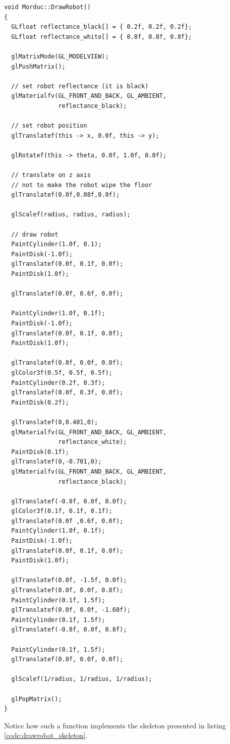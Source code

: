 \begin{lstlisting}[caption={\texttt{Morduc::DrawRobot()} function}, label={code:drawrobot}, frame=trBL]
void Morduc::DrawRobot()
{
  GLfloat reflectance_black[] = { 0.2f, 0.2f, 0.2f};
  GLfloat reflectance_white[] = { 0.8f, 0.8f, 0.8f};
  
  glMatrixMode(GL_MODELVIEW);  
  glPushMatrix();

  // set robot reflectance (it is black)
  glMaterialfv(GL_FRONT_AND_BACK, GL_AMBIENT, 
               reflectance_black);

  // set robot position
  glTranslatef(this -> x, 0.0f, this -> y);

  glRotatef(this -> theta, 0.0f, 1.0f, 0.0f);
  
  // translate on z axis
  // not to make the robot wipe the floor
  glTranslatef(0.0f,0.08f,0.0f);

  glScalef(radius, radius, radius);
  
  // draw robot
  PaintCylinder(1.0f, 0.1);
  PaintDisk(-1.0f);
  glTranslatef(0.0f, 0.1f, 0.0f);
  PaintDisk(1.0f);
  
  glTranslatef(0.0f, 0.6f, 0.0f);

  PaintCylinder(1.0f, 0.1f);
  PaintDisk(-1.0f);
  glTranslatef(0.0f, 0.1f, 0.0f);
  PaintDisk(1.0f);

  glTranslatef(0.8f, 0.0f, 0.0f);
  glColor3f(0.5f, 0.5f, 0.5f);
  PaintCylinder(0.2f, 0.3f);
  glTranslatef(0.0f, 0.3f, 0.0f);
  PaintDisk(0.2f);

  glTranslatef(0,0.401,0);
  glMaterialfv(GL_FRONT_AND_BACK, GL_AMBIENT, 
               reflectance_white);
  PaintDisk(0.1f);
  glTranslatef(0,-0.701,0);
  glMaterialfv(GL_FRONT_AND_BACK, GL_AMBIENT, 
               reflectance_black);

  glTranslatef(-0.8f, 0.0f, 0.0f);
  glColor3f(0.1f, 0.1f, 0.1f);
  glTranslatef(0.0f ,0.6f, 0.0f);
  PaintCylinder(1.0f, 0.1f);
  PaintDisk(-1.0f);
  glTranslatef(0.0f, 0.1f, 0.0f); 
  PaintDisk(1.0f);

  glTranslatef(0.0f, -1.5f, 0.0f);
  glTranslatef(0.0f, 0.0f, 0.8f);
  PaintCylinder(0.1f, 1.5f);
  glTranslatef(0.0f, 0.0f, -1.60f);
  PaintCylinder(0.1f, 1.5f);
  glTranslatef(-0.8f, 0.0f, 0.8f);

  PaintCylinder(0.1f, 1.5f);
  glTranslatef(0.8f, 0.0f, 0.0f);

  glScalef(1/radius, 1/radius, 1/radius);

  glPopMatrix();
}
\end{lstlisting}
%
Notice how such a function implements the skeleton 
presented in listing \ref{code:drawrobot_skeleton}.
%

